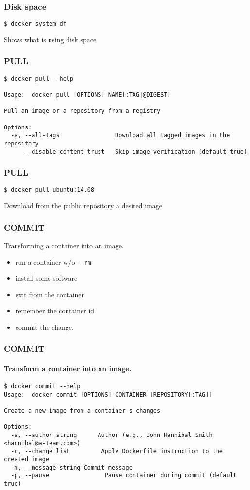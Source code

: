 \begin{frame}[fragile]
\frametitle{Disk space}
\begin{lstlisting}
$ docker system df
\end{lstlisting}
Shows what is using disk space
\end{frame}

\begin{frame}[fragile]
\frametitle{PULL}
\scriptsize
\begin{lstlisting}[breaklines=true]
$ docker pull --help

Usage:  docker pull [OPTIONS] NAME[:TAG|@DIGEST]

Pull an image or a repository from a registry

Options:
  -a, --all-tags                Download all tagged images in the repository
      --disable-content-trust   Skip image verification (default true)
\end{lstlisting}
\normalsize
\end{frame}

\begin{frame}[fragile]
\frametitle{PULL}
\begin{lstlisting}
$ docker pull ubuntu:14.08
\end{lstlisting}

Download from the public repository a desired image
\end{frame}

\begin{frame}[fragile]
\frametitle{COMMIT}
Transforming a container into an image.
\begin{itemize}
\item run a container w/o \lstinline!--rm!
\item install some software
\item exit from the container
\item remember the container id
\item commit the change.
\end{itemize}
\end{frame}

\begin{frame}[fragile]
\frametitle{COMMIT}
\framesubtitle{Transform a container into an image.}
\scriptsize
\begin{lstlisting}[breaklines=true]
$ docker commit --help
Usage:  docker commit [OPTIONS] CONTAINER [REPOSITORY[:TAG]]

Create a new image from a container s changes

Options:
  -a, --author string      Author (e.g., John Hannibal Smith <hannibal@a-team.com>)
  -c, --change list         Apply Dockerfile instruction to the created image
  -m, --message string Commit message
  -p, --pause                Pause container during commit (default true)
\end{lstlisting}
\normalsize
\end{frame}

